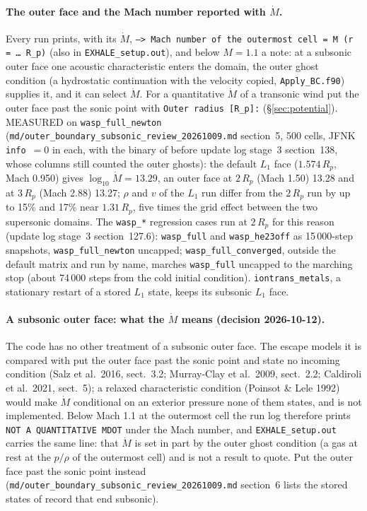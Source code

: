 \documentclass[english,a4paper]{my_memo}
\begin{document}
\paragraph{The outer face and the Mach number reported with $\dot M$.} Every
run prints, with its $\dot M$, \texttt{---> Mach number of the outermost cell
= M (r = \ldots\ R\_p)} (also in \texttt{EXHALE\_setup.out}), and below
$M=1.1$ a note: at a subsonic outer face one acoustic characteristic enters
the domain, the outer ghost condition (a hydrostatic continuation with the
velocity copied, \texttt{Apply\_BC.f90}) supplies it, and it can select
$\dot M$. For a quantitative $\dot M$ of a transonic wind put the outer face
past the sonic point with \texttt{Outer radius [R\_p]:}
(\S\ref{sec:potential}). MEASURED on \texttt{wasp\_full\_newton}
(\texttt{md/outer\_boundary\_subsonic\_review\_20261009.md} section~5, 500
cells, JFNK \texttt{info}~$=0$ in each, with the binary of before update log
stage~3 section~138, whose columns still counted the outer ghosts): the default $L_1$ face
($1.574\,R_p$, Mach 0.950) gives $\log_{10}\dot M=13.29$, an outer face at
$2\,R_p$ (Mach 1.50) 13.28 and at $3\,R_p$ (Mach 2.88) 13.27; $\rho$ and $v$
of the $L_1$ run differ from the $2\,R_p$ run by up to 15\% and 17\% near
$1.31\,R_p$, five times the grid effect between the two supersonic domains.
The \texttt{wasp\_*} regression cases run at $2\,R_p$ for this reason
(update log stage~3 section~127.6): \texttt{wasp\_full} and
\texttt{wasp\_he23off} as 15\,000-step snapshots, \texttt{wasp\_full\_newton}
uncapped; \texttt{wasp\_full\_converged}, outside the default matrix and run
by name, marches \texttt{wasp\_full} uncapped to the marching stop (about
74\,000 steps from the cold initial condition). \texttt{iontrans\_metals}, a
stationary restart of a stored $L_1$ state, keeps its subsonic $L_1$ face.

\paragraph{A subsonic outer face: what the $\dot M$ means (decision 2026-10-12).}
The code has no other treatment of a subsonic outer face. The escape models it
is compared with put the outer face past the sonic point and state no incoming
condition (Salz et al.\ 2016, sect.~3.2; Murray-Clay et al.\ 2009, sect.~2.2;
Caldiroli et al.\ 2021, sect.~5); a relaxed characteristic condition
(Poinsot \& Lele 1992) would make $\dot M$ conditional on an exterior pressure
none of them states, and is not implemented. Below Mach 1.1 at the outermost
cell the run log therefore prints \texttt{NOT A QUANTITATIVE MDOT} under the
Mach number, and \texttt{EXHALE\_setup.out} carries the same line: that
$\dot M$ is set in part by the outer ghost condition (a gas at rest at the
$p/\rho$ of the outermost cell) and is not a result to quote. Put the outer
face past the sonic point instead
(\texttt{md/outer\_boundary\_subsonic\_review\_20261009.md} section~6 lists
the stored states of record that end subsonic).
\end{document}
